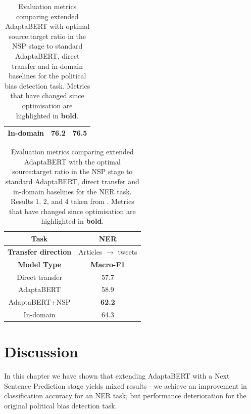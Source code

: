 \begin{table}[ht]
\begin{center}
\begin{tabular}{|c|c|c|c|c|c|}
            \hline
            \multicolumn{2}{|c|}{In-domain} & \multicolumn{2}{|c|}{76.2} & \multicolumn{2}{|c|}{76.5}  \\
            \hline
        \end{tabular}
    \end{center}
    \caption{Evaluation metrics comparing extended AdaptaBERT with optimal source:target ratio in the NSP stage to standard AdaptaBERT, direct transfer and in-domain baselines for the political bias detection task. Metrics that have changed since optimisation are highlighted in \textbf{bold}.}
    \label{tab:adaptabert-nsp-results-best}
\end{table}

\begin{table}[ht]
    \begin{center}
        \begin{tabular}{|c|c|}
            \hline
            \textbf{Task} & NER \\
            \hline
            \textbf{Transfer direction} & Articles $ \rightarrow $ tweets \\
            \hline \hline
            \textbf{Model Type} & \textbf{Macro-F1} \\
            \hline
            Direct transfer & 57.7  \\
            AdaptaBERT & 58.9  \\
            AdaptaBERT+NSP & \textbf{62.2}  \\
            \hline
            In-domain & 64.3 \\
            \hline
        \end{tabular}
    \end{center}
    \caption{Evaluation metrics comparing extended AdaptaBERT with the optimal source:target ratio in the NSP stage to standard AdaptaBERT, direct transfer and in-domain baselines for the NER task. Results 1, 2, and 4 taken from \cite{adaptabert}. Metrics that have changed since optimisation are highlighted in \textbf{bold}.}
    \label{tab:adaptabert-nsp-ner-results-best}
\end{table}

\section{Discussion}

In this chapter we have shown that extending AdaptaBERT with a Next Sentence Prediction stage yields mixed results - we achieve an improvement in classification accuracy for an NER task, but performance deterioration for the original political bias detection task.

